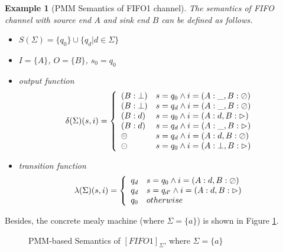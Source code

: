 \documentclass[conference, a4paper]{IEEEtran}
\newtheorem{example}{Example}
\newcommand{\rblock}[0]{\circleddash}
\newcommand{\rread}[0]{\rhd}
\newcommand{\rnoread}[0]{\oslash}
\newcommand{\smap}[1]{[{#1}]}
\begin{document}
\begin{example}[PMM Semantics of FIFO1 channel]
  \label{example:pmmfifo}
  The semantics of FIFO channel with source end $A$ and sink end $B$ can be defined as follows.
  \begin{itemize}
    \item[-] $S(\Sigma)=\{q_0\}\cup\{q_d|d\in\Sigma\}$
    \item[-] $I=\{A\}$, $O=\{B\}$, $s_0=q_0$
    \item[-] output function
      \begin{displaymath}
        \delta(\Sigma)(s,i)=\left\{
        \begin{array}[h]{ll}
          (B:\bot) & s=q_0\land i=(A:\_,B:\rnoread) \\
          (B:\bot) & s=q_d\land i=(A:\_,B:\rnoread) \\     
          (B:d) & s=q_0\land i=(A:d,B:\rread)\\
          (B:d) & s=q_d\land i=(A:\_,B:\rread)\\
          \rblock & s=q_d\land i=(A:d,B:\rnoread) \\
          \rblock & s=q_0\land i=(A:\bot,B:\rread) \\
        \end{array}
        \right.
      \end{displaymath}
    \item[-] transition function
      \begin{displaymath}
        \lambda(\Sigma)(s,i)=\left\{
        \begin{array}[h]{ll}
          q_d & s=q_0\land i=(A:d,B:\rnoread) \\
          q_d & s=q_{d'}\land i=(A:d,B:\rread) \\
          q_0 & otherwise \\
        \end{array}
        \right.
      \end{displaymath}
  \end{itemize}
\end{example}

Besides, the concrete mealy machine (where $\Sigma=\{a\}$) is shown in Figure \ref{fig:pmmfifo}.
\begin{figure}[h]
  \begin{center}
    
  \end{center}
  \caption{PMM-based Semantics of $\smap{FIFO1}_\Sigma$, where $\Sigma=\{a\}$}
  \label{fig:pmmfifo}
\end{figure}
\end{document}
